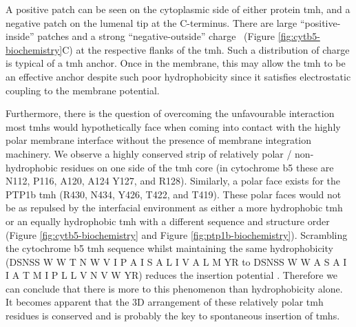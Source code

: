 A positive patch can be seen on the cytoplasmic side of either protein \gls{tmh}, and a negative patch on the lumenal tip at the C\--terminus.
There are large ``positive\--inside'' patches \cite{VonHeijne1989, Andersson1992, Sharpe2010, Baeza-Delgado2013, Pogozheva2013, Baker2017} and a strong ``negative\--outside'' charge \cite{Baker2017}~(Figure \ref{fig:cytb5-biochemistry}C) at the respective flanks of the \gls{tmh}.
Such a distribution of charge is typical of a \gls{tmh} anchor.
Once in the membrane, this may allow the \gls{tmh} to be an effective anchor despite such poor hydrophobicity since it satisfies electrostatic coupling to the membrane potential.

Furthermore, there is the question of overcoming the unfavourable interaction most \gls{tmh}s would hypothetically face when coming into contact with the highly polar membrane interface without the presence of membrane integration machinery.
We observe a highly conserved strip of relatively polar / non-hydrophobic residues on one side of the \gls{tmh} core (in cytochrome b5 these are N112, P116, A120, A124 Y127, and R128).
Similarly, a polar face exists for the PTP1b \gls{tmh} (R430, N434, Y426, T422, and T419).
These polar faces would not be as repulsed by the interfacial environment as either a more hydrophobic \gls{tmh} or an equally hydrophobic \gls{tmh} with a different sequence and structure order (Figure \ref{fig:cytb5-biochemistry} and Figure \ref{fig:ptp1b-biochemistry}).
Scrambling the cytochrome b5 \gls{tmh} sequence whilst maintaining the same hydrophobicity (DSNSS W W T N W V I P A I S A L I V A L M YR to DSNSS W W A S A I I A T M I P L L V N V W YR) reduces the insertion potential \cite{Brambillasca2006}.
Therefore we can conclude that there is more to this phenomenon than hydrophobicity alone.
It becomes apparent that the 3D arrangement of these relatively polar \gls{tmh} residues is conserved and is probably the key to spontaneous insertion of \gls{tmh}s.

